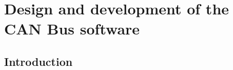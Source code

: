 \chapter{Design and development of the CAN Bus software}

\renewcommand{\chaptername}{Chapter}

\section*{Introduction}